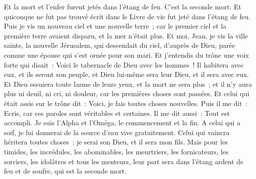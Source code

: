 \begin{multicols}{2}
Et la mort et l'enfer furent jetés dans l'étang de feu. C'est la seconde mort.
Et quiconque ne fut pas trouvé écrit dans le Livre de vie fut jeté dans l'étang de feu.
\VerseOne{}Puis je vis un nouveau ciel et une nouvelle terre~; car le premier ciel et la première terre avaient disparu, et la mer n'était plus.
Et moi, Jean, je vis la ville sainte, la nouvelle Jérusalem, qui descendait du ciel, d'auprès de Dieu, parée comme une épouse qui s'est ornée pour son mari.
Et j'entendis du trône une voix forte qui disait~: Voici le tabernacle de Dieu avec les hommes~! Il habitera avec eux, et ils seront son peuple, et Dieu lui-même sera leur Dieu, et il sera avec eux.
Et Dieu essuiera toute larme de leurs yeux, et la mort ne sera plus~; et il n'y aura plus ni deuil, ni cri, ni douleur, car les premières choses sont passées.
Et celui qui était assis sur le trône dit~: Voici, je fais toutes choses nouvelles. Puis il me dit~: Ecris, car ces paroles sont véritables et certaines.
Il me dit aussi~: Tout est accompli. Je suis l'Alpha et l'Oméga, le commencement et la fin. A celui qui a soif, je lui donnerai de la source d'eau vive gratuitement.
Celui qui vaincra héritera toutes choses~; je serai son Dieu, et il sera mon fils.
Mais pour les timides, les incrédules, les abominables, les meurtriers, les fornicateurs, les sorciers, les idolâtres et tous les menteurs, leur part sera dans l'étang ardent de feu et de soufre, qui est la seconde mort.

\end{multicols}
